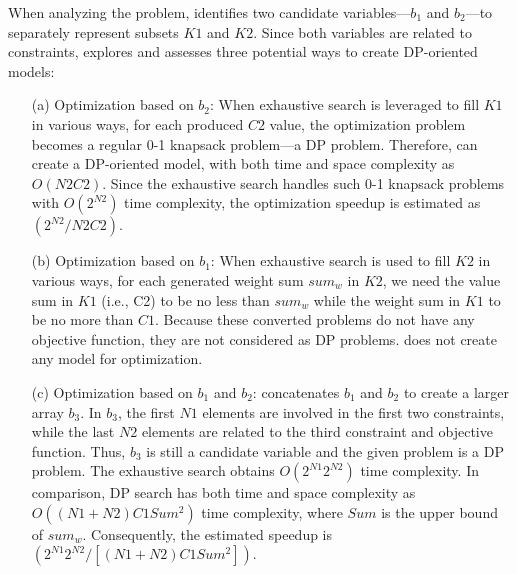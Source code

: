 When analyzing the problem, \tool identifies two candidate variables---$b_1$ and $b_2$---to separately represent subsets $K1$ and $K2$.
Since both variables are related to constraints, \tool explores and assesses three potential ways to create DP-oriented models: 

 \begin{enumerate}
     \item[(a)] Optimization based on $b_2$: %
     When exhaustive search is leveraged to
     fill $K1$ in various ways, for each produced $C2$ value, the optimization problem becomes a regular 0-1 knapsack problem---a DP problem. Therefore, \tool can create a DP-oriented model, with both time and space complexity as $O(N2C2)$. Since the exhaustive search handles such 0-1 knapsack problems with $O(2^{N2})$ time complexity, the optimization speedup is estimated as $(2^{N2}/N2C2)$.
     
      \item[(b)] Optimization based on $b_1$: When exhaustive search is used to fill $K2$ in various ways, for each generated weight sum $sum_w$ in $K2$, we need the value sum in $K1$ (i.e., C2) to be no less than $sum_w$ while the weight sum in $K1$ to be no more than $C1$. Because these converted problems do not have any objective function, they are not considered as DP problems. \tool does not create any model for optimization. 
     
     \item[(c)] Optimization based on $b_1$ and $b_2$: \tool concatenates $b_1$ and $b_2$ to create a larger array $b_3$. In $b_3$, the first $N1$ elements are involved in the first two constraints, while the last $N2$ elements are related to the third constraint and objective function. Thus, $b_3$ is still a candidate variable and the given problem is a DP problem. The exhaustive search obtains $O(2^{N1}2^{N2})$ time complexity. In comparison, DP search has both time and space complexity as 
     $O((N1+N2)C1Sum^2)$ time complexity, where $Sum$ is the upper bound of $sum_w$. Consequently, the estimated speedup is $(2^{N1}2^{N2}/\left[(N1+N2)C1Sum^2\right])$. 
 \end{enumerate}
 
